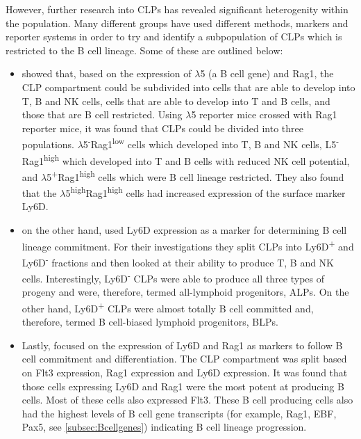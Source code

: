 However, further research into CLPs has revealed significant heterogenity within the population.
Many different groups have used different methods, markers and reporter systems in order to try and identify a subpopulation of CLPs which is restricted to the B cell lineage. 
Some of these are outlined below:
\begin{itemize}
\item \citet{Mansson2010} showed that, based on the expression of $\lambda$5 (a B cell gene) and Rag1, the CLP compartment could be subdivided into cells that are able to develop into T, B and NK cells, cells that are able to develop into T and B cells, and those that are B cell restricted.
Using $\lambda$5 reporter mice crossed with Rag1 reporter mice, it was found that CLPs could be divided into three populations.
$\lambda$5\textsuperscript{-}Rag1\textsuperscript{low} cells which developed into T, B and NK cells, L5\textsuperscript{-}Rag1\textsuperscript{high} which developed into T and B cells with reduced NK cell potential, and $\lambda$5\textsuperscript{+}Rag1\textsuperscript{high} cells which were B cell lineage restricted.
They also found that the $\lambda$5\textsuperscript{high}Rag1\textsuperscript{high} cells had increased expression of the surface marker Ly6D.
\item \citet{Inlay2009} on the other hand, used Ly6D expression as a marker for determining B cell lineage commitment.
For their investigations they split CLPs into Ly6D\textsuperscript{+} and Ly6D\textsuperscript{-} fractions and then looked at their ability to produce T, B and NK cells.
Interestingly, Ly6D\textsuperscript{-} CLPs were able to produce all three types of progeny and were, therefore, termed all-lymphoid progenitors, ALPs.
On the other hand, Ly6D\textsuperscript{+} CLPs were almost totally B cell committed and, therefore, termed B cell-biased lymphoid progenitors, BLPs.
\item Lastly, \citet{Zhang2013} focused on the expression of Ly6D and Rag1 as markers to follow B cell commitment and differentiation.
The CLP compartment was split based on Flt3 expression, Rag1 expression and Ly6D expression.
It was found that those cells expressing Ly6D and Rag1 were the most potent at producing B cells. 
Most of these cells also expressed Flt3.
These B cell producing cells also had the highest levels of B cell gene transcripts (for example, Rag1, EBF, Pax5, see \cref{subsec:Bcellgenes}) indicating B cell lineage progression.

\end{itemize}

